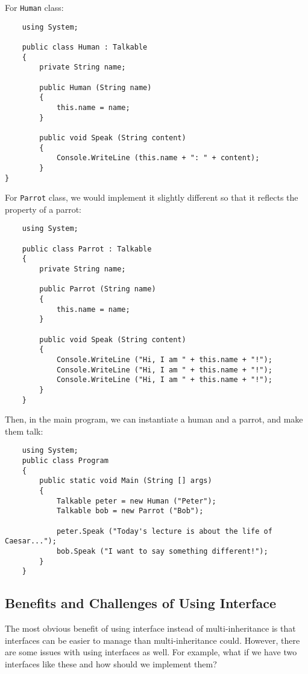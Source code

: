 \documentclass[../main.tex]{subfiles}
\begin{document}
For \texttt{Human} class:

\begin{verbatim}
    using System;

    public class Human : Talkable
    {
        private String name;

        public Human (String name)
        {
            this.name = name;
        }

        public void Speak (String content)
        {
            Console.WriteLine (this.name + ": " + content);
        }
}
\end{verbatim}

For \texttt{Parrot} class, we would implement it slightly different so that it
reflects the
property of a parrot:

\begin{verbatim}
    using System;

    public class Parrot : Talkable
    {
        private String name;

        public Parrot (String name)
        {
            this.name = name;
        }

        public void Speak (String content)
        {
            Console.WriteLine ("Hi, I am " + this.name + "!");
            Console.WriteLine ("Hi, I am " + this.name + "!");
            Console.WriteLine ("Hi, I am " + this.name + "!");
        }
    }
\end{verbatim}

Then, in the main program, we can instantiate a human and a parrot, and make
them talk:

\begin{verbatim}
    using System;
    public class Program
    {
        public static void Main (String [] args)
        {
            Talkable peter = new Human ("Peter");
            Talkable bob = new Parrot ("Bob");

            peter.Speak ("Today's lecture is about the life of Caesar...");
            bob.Speak ("I want to say something different!");
        }
    }
\end{verbatim}

\subsection{Benefits and Challenges of Using Interface}
The most obvious benefit of using interface instead of multi-inheritance is that
interfaces can be easier to manage than multi-inheritance could. However, there
are some issues with using interfaces as well. For example, what if we have two
interfaces like these and how should we implement them?
\end{document}
